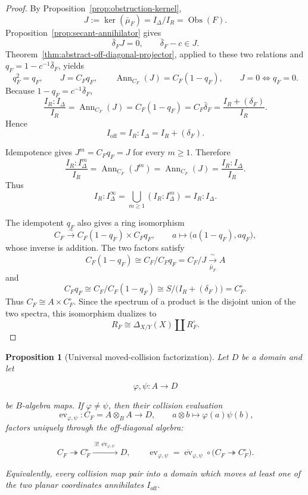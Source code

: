 \documentclass[11pt]{article}
\newtheorem{proposition}[theorem]{Proposition}
\theoremstyle{remark}
\theoremstyle{definition}
\DeclareMathOperator{\Ann}{Ann}
\newcommand{\Obs}{\operatorname{Obs}}
\begin{document}
\begin{proof}
By Proposition~\ref{prop:obstruction-kernel},
\[
  J
  :=
  \ker(\bar\mu_F)
  =
  I_\Delta/I_R
  =
  \Obs(F).
\]
Proposition~\ref{prop:secant-annihilator} gives
\[
  \bar\delta_FJ=0,
  \qquad
  \bar\delta_F-c\in J.
\]
Theorem~\ref{thm:abstract-off-diagonal-projector}, applied to these two
relations and \(q_F=1-c^{-1}\bar\delta_F\), yields
\[
  q_F^2=q_F,
  \qquad
  J=C_Fq_F,
  \qquad
  \Ann_{C_F}(J)=C_F(1-q_F),
  \qquad
  J=0\Longleftrightarrow q_F=0.
\]
Because \(1-q_F=c^{-1}\bar\delta_F\),
\[
  \frac{I_R:I_\Delta}{I_R}
  =
  \Ann_{C_F}(J)
  =
  C_F(1-q_F)
  =
  C_F\bar\delta_F
  =
  \frac{I_R+(\delta_F)}{I_R}.
\]
Hence
\[
  I_{\mathrm{off}}
  =
  I_R:I_\Delta
  =
  I_R+(\delta_F).
\]

Idempotence gives \(J^m=C_Fq_F=J\) for every \(m\geq1\).  Therefore
\[
  \frac{I_R:I_\Delta^m}{I_R}
  =
  \Ann_{C_F}(J^m)
  =
  \Ann_{C_F}(J)
  =
  \frac{I_R:I_\Delta}{I_R}.
\]
Thus
\[
  I_R:I_\Delta^\infty
  =
  \bigcup_{m\geq1}(I_R:I_\Delta^m)
  =
  I_R:I_\Delta.
\]

The idempotent \(q_F\) also gives a ring isomorphism
\[
  C_F
  \xrightarrow{\ \sim\ }
  C_F(1-q_F)\times C_Fq_F,
  \qquad
  a\longmapsto\bigl(a(1-q_F),aq_F\bigr),
\]
whose inverse is addition.  The two factors satisfy
\[
  C_F(1-q_F)
  \cong
  C_F/C_Fq_F
  =
  C_F/J
  \xrightarrow[\bar\mu_F]{\ \sim\ }
  A
\]
and
\[
  C_Fq_F
  \cong
  C_F/C_F(1-q_F)
  \cong
  S\big/\bigl(I_R+(\delta_F)\bigr)
  =
  C_F^\circ.
\]
Thus \(C_F\cong A\times C_F^\circ\).  Since the spectrum of a product is
the disjoint union of the two spectra, this isomorphism dualizes to
\[
  R_F\cong\Delta_{X/Y}(X)\amalg R_F^\circ.
\]
\end{proof}

\begin{proposition}[Universal moved-collision factorization]
\label{prop:universal-moved-collision-factorization}
Let \(D\) be a domain and let

\[
  \varphi,\psi:A\longrightarrow D
\]

be \(B\)-algebra maps.  If \(\varphi\ne\psi\), then their collision
evaluation
\[
  \operatorname{ev}_{\varphi,\psi}:C_F=A\otimes_BA\longrightarrow D,
  \qquad a\otimes b\longmapsto\varphi(a)\psi(b),
\]
factors uniquely through the off-diagonal algebra:

\[
  C_F\twoheadrightarrow C_F^\circ
  \xrightarrow{\ \exists!\,\overline{\operatorname{ev}}_{\varphi,\psi}\ }D,
  \qquad
  \operatorname{ev}_{\varphi,\psi}
  =\overline{\operatorname{ev}}_{\varphi,\psi}\circ
    \bigl(C_F\twoheadrightarrow C_F^\circ\bigr).
\]

Equivalently, every collision map pair into a domain which moves at least one
of the two planar coordinates annihilates \(I_{\mathrm{off}}\).
\end{proposition}
\end{document}
